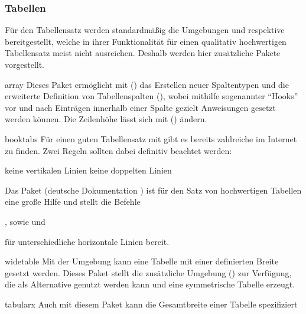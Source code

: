 %



\subsubsection{%
  Tabellen%
}
Für den Tabellensatz werden standardmäßig die Umgebungen  
und  respektive  bereitgestellt, 
welche in ihrer Funktionalität für einen qualitativ hochwertigen Tabellensatz 
meist nicht ausreichen. Deshalb werden hier zusätzliche Pakete vorgestellt. 
%
\begin{packages}
\item[array]
  Dieses Paket ermöglicht mit () das   
  Erstellen neuer Spaltentypen und die erweiterte Definition von Tabellenspalten
  (\PValue{>\MPValue{\dots}}\PValue{<\MPValue{\dots}}), 
  wobei mithilfe sogenannter \enquote{Hooks} vor und nach Einträgen innerhalb 
  einer Spalte gezielt Anweisungen gesetzt werden können. Die Zeilenhöhe lässt 
  sich mit () ändern. 
\item[booktabs]
  Für einen guten Tabellensatz mit  gibt es bereits zahlreiche 
   im 
  Internet zu finden. Zwei Regeln sollten dabei definitiv beachtet werden:
  \begin{enumerate}[itemindent=0pt,labelwidth=*,labelsep=1em,label=\Roman*.]
  \stditem keine vertikalen Linien
  \stditem keine doppelten Linien
  \end{enumerate}
  Das Paket  (deutsche Dokumentation ) 
  ist für den Satz von hochwertigen Tabellen eine große Hilfe und stellt die 
  Befehle 
  \begin{Entity}{}
  ,  sowie  und 
  \end{Entity}
  für unterschiedliche horizontale Linien bereit.
\item[widetable]
  Mit der Umgebung  kann eine Tabelle mit einer definierten 
  Breite gesetzt werden. Dieses Paket stellt die zusätzliche Umgebung 
  () zur Verfügung, die als Alternative 
  genutzt werden kann und eine symmetrische Tabelle erzeugt.
\item[tabularx]
  Auch mit diesem Paket kann die Gesamtbreite einer Tabelle spezifiziert 

\end{packages}
